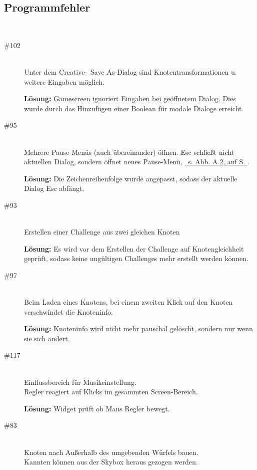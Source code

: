 %



\subsection*{Programmfehler}


~\\
\begin{description}

\item[\#102] \hfill \\
Unter dem Creative-\glqq~Save As\grqq-Dialog sind Knotentransformationen u. weitere Eingaben möglich.

{\bfseries Lösung:} Gamescreen ignoriert Eingaben bei geöffnetem Dialog. Dies wurde durch das Hinzufügen einer Boolean für modale Dialoge erreicht. 


\item[\#95] \hfill \\
Mehrere Pause-Menüs (auch übereinander) öffnen.
Esc schließt nicht aktuellen Dialog, sondern öffnet neues Pause-Menü, \hyperref[Anhang:Grafikfehler:Dialog_Pause]{\mousecursor~s. Abb. A.2, auf S. \pageref{Anhang:Grafikfehler:Dialog_Pause}}.

{\bfseries Lösung:} Die Zeichenreihenfolge wurde angepasst, sodass der aktuelle Dialog Esc abfängt.


\item[\#93] \hfill \\
Erstellen einer Challenge aus zwei gleichen Knoten

{\bfseries Lösung:}  Es wird vor dem Erstellen der Challenge auf Knotengleichheit geprüft, sodass keine ungültigen Challenges mehr erstellt werden können.


\item[\#97] \hfill \\
Beim Laden eines Knotens, bei einem zweiten Klick auf den Knoten verschwindet die Knoteninfo.

{\bfseries Lösung:} Knoteninfo wird nicht mehr pauschal gelöscht, sondern nur wenn sie sich ändert. 


\item[\#117] \hfill \\
Einflussbereich für Musikeinstellung. \\
Regler reagiert auf Klicks im gesammten Screen-Bereich.

{\bfseries Lösung:} Widget prüft ob Maus Regler bewegt.


\item[\#83] \hfill \\
Knoten nach Außerhalb des umgebenden Würfels bauen. \\
Kannten können aus der Skybox heraus gezogen werden.


\end{description}
